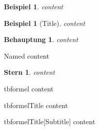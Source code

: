 \newtheorem{example}[theorem]{Beispiel}
\newtheorem*{claim*}{Behauptung}
\newtheorem*{star}{Stern}



\begin{example}
\label{a}
content
\end{example}

\begin{example}[Title]
\label{b}
content
\end{example}

\begin{claim*}
\label{c}
content
\end{claim*}

\begin{namedtheorem}{Named}
\label{d}
content
\end{namedtheorem}

\begin{star}
\label{e}
content
\end{star}

\begin{textbox}{tbformel}
content
\end{textbox}

\begin{titlebox}{tbformel}{Title}
\label{x}
content
\end{titlebox}

\begin{titlebox*}{tbformel}{Title}[Subtitle]
\label{x}
content
\end{titlebox*}



